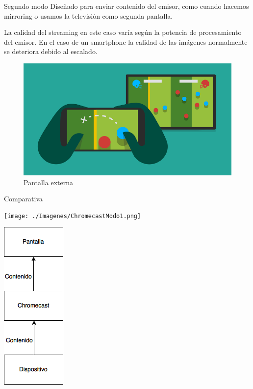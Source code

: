 	
\begin{frame}
	\begin{block}{Segundo modo}
		Diseñado para enviar contenido del emisor, como cuando hacemos mirroring o usamos la televisión como segunda pantalla.
		
		La calidad del streaming en este caso varía según la potencia de procesamiento del emisor. En el caso de un smartphone la calidad
		de las imágenes normalmente se deteriora debido al escalado.
	\end{block}
	
	\begin{figure}[h]
			\includegraphics[scale=0.3]{./Imagenes/seconddisplay.png}
			\caption{Pantalla externa}\label{fig:seconddisplay}
	\end{figure}		
\end{frame}


\begin{frame}{Comparativa}
	\begin{minipage}[b]{.45\textwidth}
		\centering
		\texttt{[image: ./Imagenes/ChromecastModo1.png]}
	\end{minipage}\qquad
	\hspace{1.65cm}
	\begin{minipage}[b]{.3\textwidth}
		\centering
		\includegraphics[scale=0.52]{./Imagenes/ChromecastModo2.png}
	\end{minipage}
\end{frame}



